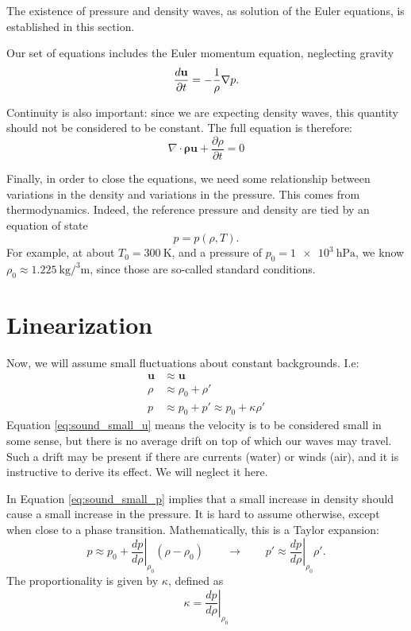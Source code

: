 
The existence of pressure and density waves, as solution of the Euler
equations, is established in this section.

Our set of equations includes the Euler momentum equation, neglecting
gravity
\[
\frac{d \mathbf{u} }{\partial t}= - \frac{1}{\rho} \nabla p  .
\]

Continuity is also important: since we are expecting density waves,
this quantity should not be considered to be constant. The full
equation is therefore:
\[
\nabla \cdot \mathbf{\rho u} + \frac{\partial
\rho}{\partial t} =0
\]

Finally, in order to close the equations, we need some relationship
between variations in the density and variations in the pressure. This
comes from thermodynamics. Indeed, the reference pressure and density
are tied by an equation of state
\[
p=p(\rho,T) .\] For example, at about $T_0=\SI{300}{\kelvin}$, and a
pressure of $p_0=\SI{1e3}{\hecto\pascal}$, we know
$\rho_0\approx\SI{1.225}{\kilo\gram\per\cubed\meter}$, since those are
so-called standard conditions.

\section{Linearization}

Now, we will assume small fluctuations about constant backgrounds. I.e:
\begin{align}
  \label{eq:sound_small_u}
  \mathbf{u} & \approx \mathbf{u} \\
  \label{eq:sound_small_rho}
  \rho       & \approx \rho_0 + \rho' \\
  \label{eq:sound_small_p}
  p          & \approx p_0+ p' \approx p_0+ \kappa \rho'
\end{align}
Equation \ref{eq:sound_small_u} means the velocity is to be considered
small in some sense, but there is no average drift on top of which our
waves may travel. Such a drift may be present if there are currents
(water) or winds (air), and it is instructive to derive its effect. We
will neglect it here.

In Equation \ref{eq:sound_small_p} implies that a small increase in
density should cause a small increase in the pressure. It is hard to
assume otherwise, except when close to a phase
transition. Mathematically, this is a Taylor expansion:
\[
p \approx
p_0 +
\left. \frac{d p}{d\rho} \right|_{\rho_0} (\rho-\rho_0)
\qquad\to\qquad
p' \approx \left. \frac{d p}{d\rho} \right|_{\rho_0} \rho' .
\]
The proportionality is given by $\kappa$, defined as
\begin{equation}
  \label{eq:sound_kappa}
  \kappa =  \left. \frac{d p}{d\rho} \right|_{\rho_0} 
\end{equation}

